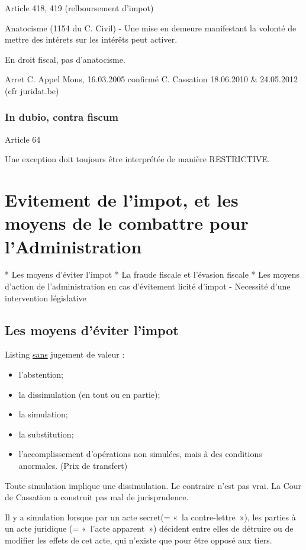 \documentclass{book}
\begin{document}
Article 418, 419 (relboursement d'impot)

Anatocisme (1154 du C. Civil) - Une mise en demeure manifestant la volonté de mettre des intérets sur les intérêts peut activer.

En droit fiscal, pas d'anatocisme.

Arret C. Appel Mons, 16.03.2005 confirmé C. Cassation 18.06.2010 & 24.05.2012 (cfr juridat.be)

\subsection{In dubio, contra fiscum}    
   
   Article 64
   
   Une exception doit toujours être interprétée de manière RESTRICTIVE. 
   
\chapter{Evitement de l'impot, et les moyens de le combattre pour l'Administration}
   
* Les moyens d'éviter l'impot
* La fraude fiscale et l'évasion fiscale
* Les moyens d'action de l'administration en cas d'évitement licité d'impot - Necessité d'une intervention législative

\section{Les moyens d'éviter l'impot} 
   
   Listing \underline{sans} jugement de valeur :
   
\begin{itemize}
\item l'abstention;
\item la dissimulation (en tout ou en partie);
\item la simulation;
\item la substitution;
\item l'accomplissement d'opérations non simulées, mais à des conditions anormales. (Prix de transfert)
\end{itemize}
   
   Toute simulation implique une dissimulation. Le contraire n'est pas vrai. La Cour de Cassation a construit pas mal de jurisprudence.
   
   Il y a simulation lorsque par un acte secret(= «~la contre-lettre~»), les parties à un acte juridique (= «~l'acte apparent~») décident entre elles de détruire ou de modifier les effets de cet acte, qui n'existe que pour être opposé aux tiers.
   
\end{document}

